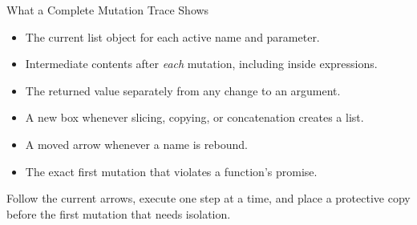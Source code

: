 \documentclass[aspectratio=169,10pt]{beamer}
\begin{document}
\begin{frame}{What a Complete Mutation Trace Shows}
  \begin{itemize}
    \item The current list object for each active name and parameter.
    \item Intermediate contents after \emph{each} mutation, including inside expressions.
    \item The returned value separately from any change to an argument.
    \item A new box whenever slicing, copying, or concatenation creates a list.
    \item A moved arrow whenever a name is rebound.
    \item The exact first mutation that violates a function's promise.
  \end{itemize}
  \begin{keyidea}
    Follow the current arrows, execute one step at a time, and place a protective copy before the first mutation that needs isolation.
  \end{keyidea}
\end{frame}
\end{document}
